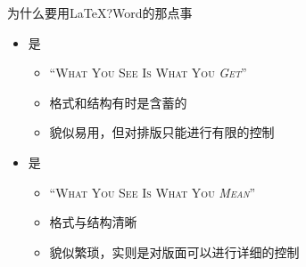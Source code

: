 \documentclass[fontset = none, xcolor=svgnames, t, aspectratio=169]{ctexbeamer}
\begin{document}
\begin{frame}{为什么要用\LaTeX?}{Word的那点事}
  \stretchon
  \begin{itemize}
  \item \msoffice 是 \wysiwyg
    \begin{itemize}
    \item ``\textsc{What You See Is What You \emph{Get}}''
    \item 格式和结构有时是含蓄的
    \item 貌似易用，但对排版只能进行有限的控制
    \end{itemize}
  \item \latex 是 \wysiwym
    \begin{itemize}
    \item ``\textsc{What You See Is What You \emph{Mean}}''
    \item 格式与结构清晰
    \item 貌似繁琐，实则是对版面可以进行详细的控制
    \end{itemize}
  \end{itemize}
  \stretchoff
\end{frame}
\end{document}
